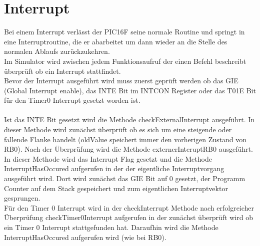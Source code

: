 \newpage
\section{Interrupt}
Bei einem Interrupt verl\"asst der PIC16F seine normale Routine und springt in eine Interruptroutine, die er abarbeitet um dann wieder an die Stelle des normalen Ablaufs zur\"uckzukehren.
\\
\noindent Im Simulator wird zwischen jedem Funktionsaufruf der einen Befehl beschreibt \"uberpr\"uft ob ein Interrupt stattfindet.
\\

\noindent Bevor der Interrupt ausgef\"uhrt wird muss zuerst gepr\"uft werden ob das GIE (Global Interrupt enable), das INTE Bit im INTCON Register oder das T01E Bit f\"ur den Timer0 Interrupt gesetzt worden ist.
\\
\\Ist das INTE Bit gesetzt wird die Methode checkExternalInterrupt ausgef\"uhrt. In dieser Methode wird zun\"achst \"uberpr\"uft ob es sich um eine steigende oder fallende Flanke handelt (oldValue speichert immer den vorherigen Zustand von RB0). Nach der \"Uberpr\"ufung wird die Methode externerInteruptRB0 ausgef\"uhrt.
\\

In dieser Methode  wird das Interrupt Flag gesetzt und die Methode InterruptHasOccured aufgerufen in der der eigentliche Interruptvorgang ausgef\"uhrt wird. Dort wird zun\"achst das GIE Bit auf 0 gesetzt, der Programm Counter auf dem Stack gespeichert und zum eigentlichen Interruptvektor gesprungen.
\\

\newpage
\noindent F\"ur den Timer 0 Interrupt wird in der checkInterrupt Methode nach erfolgreicher \"Uberpr\"ufung checkTimer0Interrupt aufgerufen in der zun\"achst \"uberpr\"uft wird ob ein Timer 0 Interrupt stattgefunden hat. Daraufhin wird die Methode InterruptHasOccured aufgerufen wird (wie bei RB0). 

\\